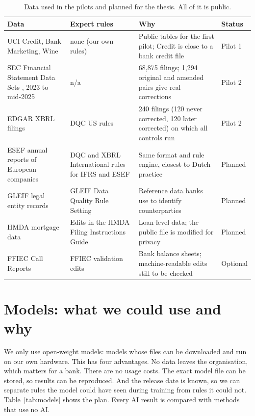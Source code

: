 \documentclass[11pt,a4paper]{article}
\begin{document}
\begin{table}[htbp]
\centering
\small
\begin{tabularx}{\textwidth}{@{}p{3.5cm}p{3.3cm}Lp{1.5cm}@{}}
\toprule
Data & Expert rules & Why & Status \\
\midrule
UCI Credit, Bank Marketing, Wine \cite{uci-credit,uci-bank,uci-wine} & none (our own rules) & Public tables for the first pilot; Credit is close to a bank credit file & Pilot 1 \\
SEC Financial Statement Data Sets \cite{fsds}, 2023 to mid-2025 & n/a & 68{,}875 filings; 1{,}294 original and amended pairs give real corrections & Pilot 2 \\
EDGAR XBRL filings & DQC US rules \cite{dqc} & 240 filings (120 never corrected, 120 later corrected) on which all controls run & Pilot 2 \\
ESEF annual reports of European companies \cite{esef} & DQC and XBRL International rules for IFRS and ESEF \cite{dqc} & Same format and rule engine, closest to Dutch practice & Planned \\
GLEIF legal entity records \cite{gleif} & GLEIF Data Quality Rule Setting & Reference data banks use to identify counterparties & Planned \\
HMDA mortgage data \cite{hmda} & Edits in the HMDA Filing Instructions Guide & Loan-level data; the public file is modified for privacy & Planned \\
FFIEC Call Reports & FFIEC validation edits & Bank balance sheets; machine-readable edits still to be checked & Optional \\
\bottomrule
\end{tabularx}
\caption{Data used in the pilots and planned for the thesis. All of it is public.}
\label{tab:data}
\end{table}

\section{Models: what we could use and why}

We only use open-weight models: models whose files can be downloaded and run on our own hardware. This has four advantages. No data leaves the organisation, which matters for a bank. There are no usage costs. The exact model file can be stored, so results can be reproduced. And the release date is known, so we can separate rules the model could have seen during training from rules it could not. Table~\ref{tab:models} shows the plan. Every AI result is compared with methods that use no AI.
\end{document}
